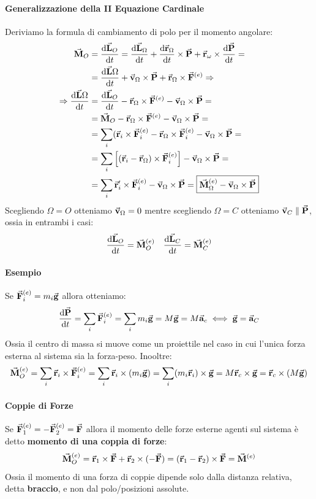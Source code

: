 \documentclass{article}
\newcommand{\then}{\ensuremath{\Rightarrow}}
\renewcommand{\a}{\va{a}}
\renewcommand{\v}{\va{v}}
\renewcommand{\r}{\va{r}}
\newcommand{\g}{\va{g}}
\newcommand{\F}{\va{F}}
\newcommand{\M}{\va{M}}
\renewcommand{\P}{\va{P}}
\renewcommand{\L}{\va{L}}
\begin{document}
\paragraph{Generalizzazione della II Equazione Cardinale}
Deriviamo la formula di cambiamento di polo per il momento angolare:
\begin{equation}
\begin{split}
    \M_O&=\dv{\L_O}{t}=\dv{\L_{\Omega}}{t}+\dv{\r_{\Omega}}{t}\times\P+\r_{\omega}\times\dv{\P}{t}=\\
    &=\dv{\L{\Omega}}{t}+\v_{\Omega}\times\P+\r_{\Omega}\times\F^{(e)}\then\\
    \then \dv{\L{\Omega}}{t}&=\dv{\L_O}{t}-\r_{\Omega}\times\F^{(e)}-\v_{\Omega}\times\P=\\
    &=\M_O-\r_{\Omega}\times\F^{(e)}-\v_{\Omega}\times\P=\\
    &=\sum_i(\r_i\times\F_i^{(e)}-\r_{\Omega}\times\F_i^{(e)}-\v_{\Omega}\times\P=\\
    &=\sum_i\left[(\r_i-\r_{\Omega})\times\F_i^{(e)}\right]-\v_{\Omega}\times\P=\\
    &=\sum_i\r_i'\times\F_i^{(e)}-\v_{\Omega}\times\P=\boxed{\M_{\Omega}^{(e)}-\v_{\Omega}\times\P}
\end{split}
\end{equation}
Scegliendo $\Omega=O$ otteniamo $\v_{\Omega}=0$ mentre scegliendo $\Omega=C$ otteniamo $\v_C\parallel\P$, ossia in entrambi i casi:
\[\dv{\L_O}{t}=\M_O^{(e)}\quad\dv{\L_C}{t}=\M_C^{(e)}\]


\paragraph{Esempio}
Se $\F_i^{(e)}=m_i\g$ allora otteniamo:
\[\dv{\P}{t}=\sum_i\F_i^{(e)}=\sum_im_i\g=M\g=M\a_c\iff \g=\a_C\]
Ossia il centro di massa si muove come un proiettile nel caso in cui l'unica forza esterna al sistema sia la forza-peso. Inooltre:
\[\M_O^{(e)}=\sum_i\r_i\times\F_i^{(e)}=\sum_i\r_i\times(m_i\g)=\sum_i(m_i\r_i)\times\g=M\r_c\times\g=\r_c\times(M\g)\]
\paragraph{Coppie di Forze}
Se $\F_1^{(e)}=-\F_2^{(e)}=\F$ allora il momento delle forze esterne agenti sul sistema è detto \textbf{momento di una coppia di forze}:
\begin{equation}
    \M_O^{(e)}=\r_1\times\F+\r_2\times(-\F)=(\r_1-\r_2)\times\F=\M^{(e)}
\end{equation}
Ossia il momento di una forza di coppie dipende solo dalla distanza relativa, detta \textbf{braccio}, e non dal polo/posizioni assolute.
\end{document}
